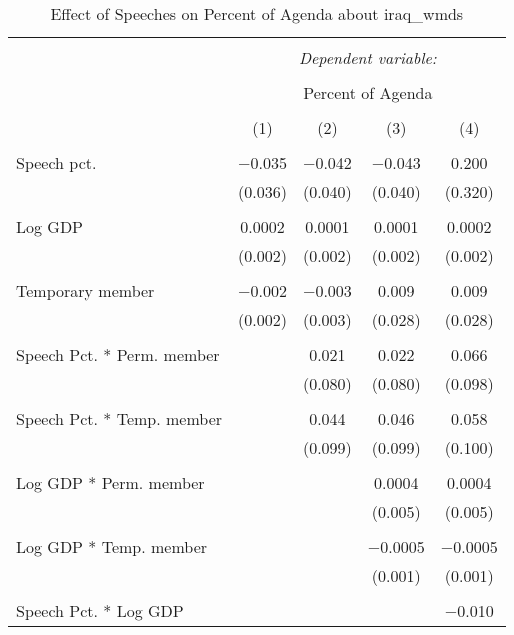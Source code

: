 
\begin{table}[!htbp] \centering 
  \caption{Effect of Speeches on Percent of Agenda about  iraq_wmds} 
  \label{} 
\begin{tabular}{@{\extracolsep{5pt}}lcccc} 
\\[-1.8ex]\hline 
\hline \\[-1.8ex] 
 & \multicolumn{4}{c}{\textit{Dependent variable:}} \\ 
\cline{2-5} 
\\[-1.8ex] & \multicolumn{4}{c}{Percent of Agenda} \\ 
\\[-1.8ex] & (1) & (2) & (3) & (4)\\ 
\hline \\[-1.8ex] 
 Speech pct. & $-$0.035 & $-$0.042 & $-$0.043 & 0.200 \\ 
  & (0.036) & (0.040) & (0.040) & (0.320) \\ 
  & & & & \\ 
 Log GDP & 0.0002 & 0.0001 & 0.0001 & 0.0002 \\ 
  & (0.002) & (0.002) & (0.002) & (0.002) \\ 
  & & & & \\ 
 Temporary member & $-$0.002 & $-$0.003 & 0.009 & 0.009 \\ 
  & (0.002) & (0.003) & (0.028) & (0.028) \\ 
  & & & & \\ 
 Speech Pct. * Perm. member &  & 0.021 & 0.022 & 0.066 \\ 
  &  & (0.080) & (0.080) & (0.098) \\ 
  & & & & \\ 
 Speech Pct. * Temp. member &  & 0.044 & 0.046 & 0.058 \\ 
  &  & (0.099) & (0.099) & (0.100) \\ 
  & & & & \\ 
 Log GDP * Perm. member &  &  & 0.0004 & 0.0004 \\ 
  &  &  & (0.005) & (0.005) \\ 
  & & & & \\ 
 Log GDP * Temp. member &  &  & $-$0.0005 & $-$0.0005 \\ 
  &  &  & (0.001) & (0.001) \\ 
  & & & & \\ 
 Speech Pct. * Log GDP &  &  &  & $-$0.010 \\ 

\end{tabular}
\end{table}
